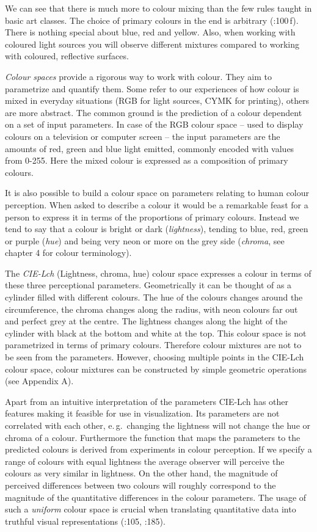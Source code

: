 \documentclass[a4paper]{scrartcl}
\begin{document}
We can see that there is much more to colour mixing than the few rules taught in basic art classes. The choice of primary colours in the end is arbitrary (\cite{Ware2013}:100\,f). There is nothing special about blue, red and yellow. Also, when working with coloured light sources you will observe different mixtures compared to working with coloured, reflective surfaces.

\emph{Colour spaces} provide a rigorous way to work with colour. They aim to parametrize and quantify them. Some refer to our experiences of how colour is mixed in everyday situations (RGB for light sources, CYMK for printing), others are more abstract. The common ground is the prediction of a colour dependent on a set of input parameters. In case of the RGB colour space -- used to display colours on a television or computer screen -- the input parameters are the amounts of red, green and blue light emitted, commonly encoded with values from 0-255. Here the mixed colour is expressed as a composition of primary colours.

It is also possible to build a colour space on parameters relating to human colour perception. When asked to describe a colour it would be a remarkable feast for a person to express it in terms of the proportions of primary colours. Instead we tend to say that a colour is bright or dark (\emph{lightness}), tending to blue, red, green or purple (\emph{hue}) and being very neon or more on the grey side (\emph{chroma}, see \cite{Fairchild2005} chapter 4 for colour terminology).

The \emph{CIE-Lch} (Lightness, chroma, hue) colour space expresses a colour in terms of these three perceptional parameters. Geometrically it can be thought of as a cylinder filled with different colours. The hue of the colours changes around the circumference, the chroma changes along the radius, with neon colours far out and perfect grey at the centre. The lightness changes along the hight of the cylinder with black at the bottom and white at the top. This colour space is not parametrized in terms of primary colours. Therefore colour mixtures are not to be seen from the parameters. However, choosing multiple points in the CIE-Lch colour space, colour mixtures can be constructed by simple geometric operations (see Appendix A).

Apart from an intuitive interpretation of the parameters CIE-Lch has other features making it feasible for use in visualization. Its parameters are not correlated with each other, e.\,g.~changing the lightness will not change the hue or chroma of a colour. Furthermore the function that maps the parameters to the predicted colours is derived from experiments in colour perception. If we specify a range of colours with equal lightness the average observer will perceive the colours as very similar in lightness. On the other hand, the magnitude of perceived differences between two colours will roughly correspond to the magnitude of the quantitative differences in the colour parameters. The usage of such a \emph{uniform} colour space is crucial when translating quantitative data into truthful visual representations (\cite{Ware2013}:105, \cite{Fairchild2005}:185).
\end{document}
